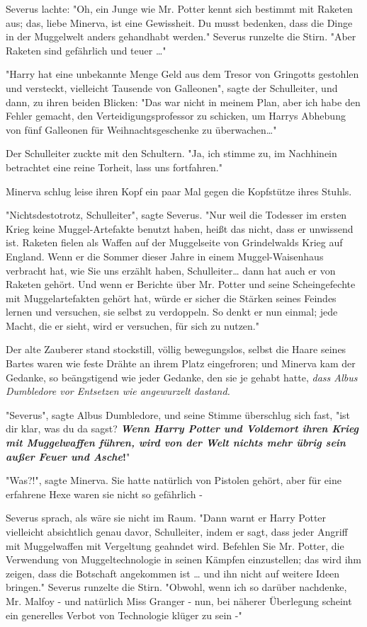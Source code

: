 {Severus lachte: "Oh, ein Junge wie Mr. Potter kennt sich bestimmt mit Raketen aus; das, liebe Minerva, ist eine Gewissheit. Du musst bedenken, dass die Dinge in der Muggelwelt anders gehandhabt werden." Severus runzelte die Stirn. "Aber Raketen sind gefährlich und teuer …"

"Harry hat eine unbekannte Menge Geld aus dem Tresor von Gringotts gestohlen und versteckt, vielleicht Tausende von Galleonen", sagte der Schulleiter, und dann, zu ihren beiden Blicken: "Das war nicht in meinem Plan, aber ich habe den Fehler gemacht, den Verteidigungsprofessor zu schicken, um Harrys Abhebung von fünf Galleonen für Weihnachtsgeschenke zu überwachen…"

Der Schulleiter zuckte mit den Schultern. "Ja, ich stimme zu, im Nachhinein betrachtet eine reine Torheit, lass uns fortfahren."

Minerva schlug leise ihren Kopf ein paar Mal gegen die Kopfstütze ihres Stuhls.

"Nichtsdestotrotz, Schulleiter", sagte Severus. "Nur weil die Todesser im ersten Krieg keine Muggel-Artefakte benutzt haben, heißt das nicht, dass er unwissend ist. Raketen fielen als Waffen auf der Muggelseite von Grindelwalds Krieg auf England. Wenn er die Sommer dieser Jahre in einem Muggel-Waisenhaus verbracht hat, wie Sie uns erzählt haben, Schulleiter… dann hat auch er von Raketen gehört. Und wenn er Berichte über Mr. Potter und seine Scheingefechte mit Muggelartefakten gehört hat, würde er sicher die Stärken seines Feindes lernen und versuchen, sie selbst zu verdoppeln. So denkt er nun einmal; jede Macht, die er sieht, wird er versuchen, für sich zu nutzen."

Der alte Zauberer stand stockstill, völlig bewegungslos, selbst die Haare seines Bartes waren wie feste Drähte an ihrem Platz eingefroren; und Minerva kam der Gedanke, so beängstigend wie jeder Gedanke, den sie je gehabt hatte, \emph{dass Albus Dumbledore vor Entsetzen wie angewurzelt dastand.}

"Severus", sagte Albus Dumbledore, und seine Stimme überschlug sich fast, "ist dir klar, was du da sagst? \textbf{\emph{Wenn Harry Potter und Voldemort ihren Krieg mit Muggelwaffen führen, wird von der Welt nichts mehr übrig sein außer Feuer und Asche}!}"

"Was?!", sagte Minerva. Sie hatte natürlich von Pistolen gehört, aber für eine erfahrene Hexe waren sie nicht so gefährlich -

Severus sprach, als wäre sie nicht im Raum. "Dann warnt er Harry Potter vielleicht absichtlich genau davor, Schulleiter, indem er sagt, dass jeder Angriff mit Muggelwaffen mit Vergeltung geahndet wird. Befehlen Sie Mr. Potter, die Verwendung von Muggeltechnologie in seinen Kämpfen einzustellen; das wird ihm zeigen, dass die Botschaft angekommen ist … und ihn nicht auf weitere Ideen bringen." Severus runzelte die Stirn. "Obwohl, wenn ich so darüber nachdenke, Mr. Malfoy - und natürlich Miss Granger - nun, bei näherer Überlegung scheint ein generelles Verbot von Technologie klüger zu sein -"

}
